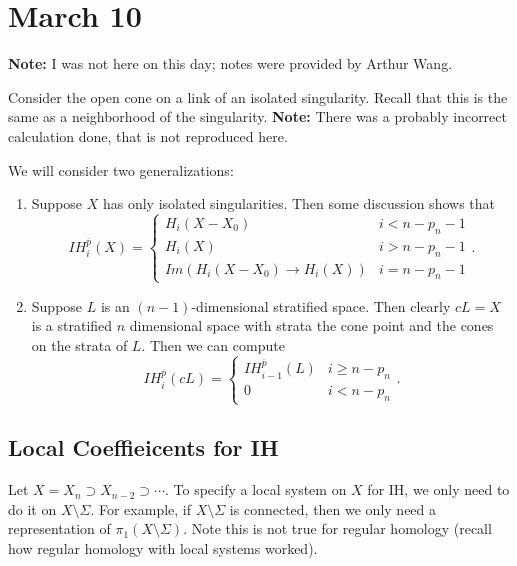 \documentclass[leqno, openany]{memoir}
\theoremstyle{definition}
\theoremstyle{remark}
\theoremstyle{plain}
\theoremstyle{definition}
\theoremstyle{remark}
\begin{document}
\chapter{March 10}%
\label{cha:march_10}

\textbf{Note:} I was not here on this day; notes were provided by Arthur Wang.

Consider the open cone on a link of an isolated singularity. Recall that this is the same as a neighborhood of the singularity. \textbf{Note:} There was a probably incorrect calculation done, that is not reproduced here.

We will consider two generalizations:
\begin{enumerate}
    \item Suppose $X$ has only isolated singularities. Then some discussion shows that
        \[ IH_i^{\overline{p}}(X) = \begin{cases}
            H_i(X - X_0) & i < n - p_n - 1 \\
            H_i(X) & i > n - p_n - 1 \\
            Im(H_i(X-X_0) \to H_i(X)) & i = n - p_n - 1
        \end{cases}. \]
    \item Suppose $L$ is an $(n-1)$-dimensional stratified space. Then clearly $cL = X$ is a stratified $n$ dimensional space with strata the cone point and the cones on the strata of $L$. Then we can compute
        \[ IH_i^{\overline{p}}(cL) = \begin{cases}
            IH_{i-1}^{\overline{p}}(L) & i \geq n - p_n \\
            0 & i < n - p_n
        \end{cases}. \]
\end{enumerate}

\section{Local Coeffieicents for IH}%
\label{sec:local_coeffieicents_for_ih}

Let $X = X_n \supset X_{n-2} \supset \cdots$. To specify a local system on $X$ for IH, we only need to do it on $X \setminus \Sigma$. For example, if $X \setminus \Sigma$ is connected, then we only need a representation of $\pi_1(X \setminus \Sigma)$. Note this is not true for regular homology (recall how regular homology with local systems worked).
\end{document}
